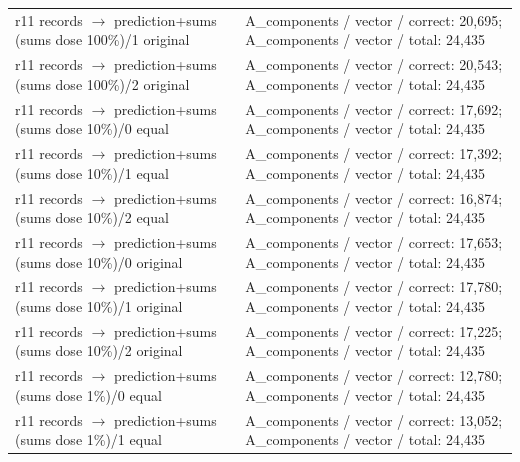\begin{longtable}{@{}>{\raggedright\arraybackslash}p{1.800in}>{\raggedright\arraybackslash}p{4.200in}@{}}
r11 records $\to$ prediction+sums (sums dose 100\%)/\allowbreak{}1 original & A\_\allowbreak{}components /\allowbreak{} vector /\allowbreak{} correct: 20,695; A\_\allowbreak{}components /\allowbreak{} vector /\allowbreak{} total: 24,435 \\
r11 records $\to$ prediction+sums (sums dose 100\%)/\allowbreak{}2 original & A\_\allowbreak{}components /\allowbreak{} vector /\allowbreak{} correct: 20,543; A\_\allowbreak{}components /\allowbreak{} vector /\allowbreak{} total: 24,435 \\
r11 records $\to$ prediction+sums (sums dose 10\%)/\allowbreak{}0 equal & A\_\allowbreak{}components /\allowbreak{} vector /\allowbreak{} correct: 17,692; A\_\allowbreak{}components /\allowbreak{} vector /\allowbreak{} total: 24,435 \\
r11 records $\to$ prediction+sums (sums dose 10\%)/\allowbreak{}1 equal & A\_\allowbreak{}components /\allowbreak{} vector /\allowbreak{} correct: 17,392; A\_\allowbreak{}components /\allowbreak{} vector /\allowbreak{} total: 24,435 \\
r11 records $\to$ prediction+sums (sums dose 10\%)/\allowbreak{}2 equal & A\_\allowbreak{}components /\allowbreak{} vector /\allowbreak{} correct: 16,874; A\_\allowbreak{}components /\allowbreak{} vector /\allowbreak{} total: 24,435 \\
r11 records $\to$ prediction+sums (sums dose 10\%)/\allowbreak{}0 original & A\_\allowbreak{}components /\allowbreak{} vector /\allowbreak{} correct: 17,653; A\_\allowbreak{}components /\allowbreak{} vector /\allowbreak{} total: 24,435 \\
r11 records $\to$ prediction+sums (sums dose 10\%)/\allowbreak{}1 original & A\_\allowbreak{}components /\allowbreak{} vector /\allowbreak{} correct: 17,780; A\_\allowbreak{}components /\allowbreak{} vector /\allowbreak{} total: 24,435 \\
r11 records $\to$ prediction+sums (sums dose 10\%)/\allowbreak{}2 original & A\_\allowbreak{}components /\allowbreak{} vector /\allowbreak{} correct: 17,225; A\_\allowbreak{}components /\allowbreak{} vector /\allowbreak{} total: 24,435 \\
r11 records $\to$ prediction+sums (sums dose 1\%)/\allowbreak{}0 equal & A\_\allowbreak{}components /\allowbreak{} vector /\allowbreak{} correct: 12,780; A\_\allowbreak{}components /\allowbreak{} vector /\allowbreak{} total: 24,435 \\
r11 records $\to$ prediction+sums (sums dose 1\%)/\allowbreak{}1 equal & A\_\allowbreak{}components /\allowbreak{} vector /\allowbreak{} correct: 13,052; A\_\allowbreak{}components /\allowbreak{} vector /\allowbreak{} total: 24,435 \\

\end{longtable}
